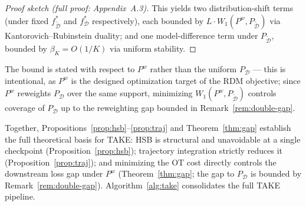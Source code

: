 \begin{foldable}
\begin{proof}[Proof sketch (full proof: Appendix~A.3)]
    This yields two distribution-shift terms (under fixed $f^*_{\tilde{\mathcal{D}}}$ and $f^*_\mathcal{D}$ respectively), each bounded by $L \cdot W_1(P^w, P_{\tilde{\mathcal{D}}})$ via Kantorovich--Rubinstein duality; and one model-difference term under $P_{\tilde{\mathcal{D}}}$, bounded by $\beta_K = O(1/K)$ via uniform stability.
  \end{proof}
  The bound is stated with respect to $P^w$ rather than the uniform $P_\mathcal{D}$ --- this is intentional, as $P^w$ is the designed optimization target of the RDM objective; since $P^w$ reweights $P_\mathcal{D}$ over the same support, minimizing $W_1(P^w, P_{\tilde{\mathcal{D}}})$ controls coverage of $P_\mathcal{D}$ up to the reweighting gap bounded in Remark~\ref{rem:double-gap}.
\end{foldable}

\begin{foldable} %
  Together, Propositions~\ref{prop:hsb}--\ref{prop:traj} and Theorem~\ref{thm:gap} establish the full theoretical basis for TAKE: HSB is structural and unavoidable at a single checkpoint (Proposition~\ref{prop:hsb}); trajectory integration strictly reduces it (Proposition~\ref{prop:traj}); and minimizing the OT cost directly controls the downstream loss gap under $P^w$ (Theorem~\ref{thm:gap}; the gap to $P_\mathcal{D}$ is bounded by Remark~\ref{rem:double-gap}).
  Algorithm~\ref{alg:take} consolidates the full TAKE pipeline.
\end{foldable}

